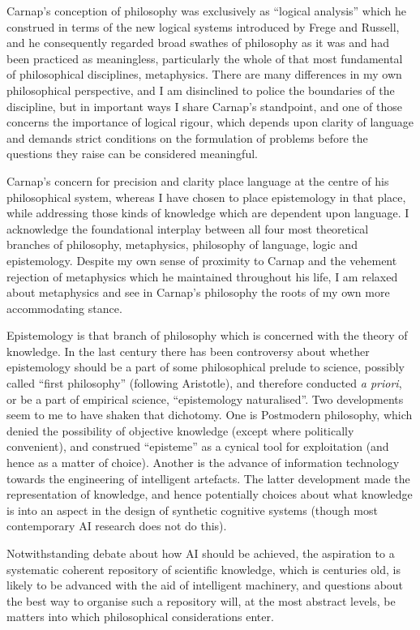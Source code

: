 \documentclass[10pt,titlepage]{book}
\begin{document}
Carnap’s conception of philosophy was exclusively as ``logical analysis'' which he construed in terms of the new logical systems introduced by Frege and Russell, and he consequently regarded broad swathes of philosophy as it was and had been practiced as meaningless, particularly the whole of that most fundamental of philosophical disciplines, metaphysics.
There are many differences in my own philosophical perspective, and I am disinclined to police the boundaries of the discipline, but in important ways I share Carnap’s standpoint, and one of those concerns the importance of logical rigour, which depends upon clarity of language and demands strict conditions on the formulation of problems before the questions they raise can be considered meaningful.

Carnap’s concern for precision and clarity place language at the centre of his philosophical system, whereas I have chosen to place epistemology in that place, while addressing those kinds of knowledge which are dependent upon language.
I acknowledge the foundational interplay between all four most theoretical branches of philosophy, metaphysics, philosophy of language, logic and epistemology.
Despite my own sense of proximity to Carnap and the vehement rejection of metaphysics which he maintained throughout his life, I am relaxed about metaphysics and see in Carnap’s philosophy the roots of my own more accommodating stance.

Epistemology is that branch of philosophy which is concerned with the theory of knowledge.
In the last century there has been controversy about whether epistemology should be a part of some philosophical prelude to science, possibly called “first philosophy” (following Aristotle), and therefore conducted \emph{a priori}, or be a part of empirical science, “epistemology naturalised”.
Two developments seem to me to have shaken that dichotomy.
One is Postmodern philosophy, which denied the possibility of objective knowledge (except where politically convenient), and construed “episteme” as a cynical tool for exploitation (and hence as a matter of choice).
Another is the advance of information technology towards the engineering of intelligent artefacts.  The latter development made the representation of knowledge, and hence potentially choices about what knowledge is into an aspect in the design of synthetic cognitive systems (though most contemporary AI research does not do this).

Notwithstanding debate about how AI should be achieved, the aspiration to a systematic coherent repository of scientific knowledge, which is centuries old, is likely to be advanced with the aid of intelligent machinery, and questions about the best way to organise such a repository will, at the most abstract levels, be matters into which philosophical considerations enter.
\end{document}
